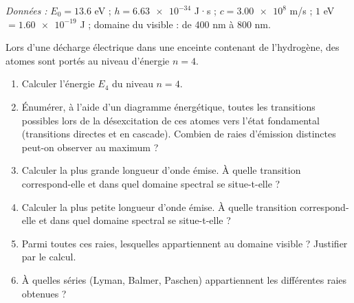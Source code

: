 \documentclass[11pt]{article}
\begin{document}
\begin{exercice}[Type Bac : désexcitation depuis le niveau $n = 4$]
\textit{Données :} $E_0 = \num{13,6}$ eV ; $h = \num{6,63e-34}$ J·s ; $c = \num{3,00e8}$ m/s ; $\num{1}$ eV $= \num{1,60e-19}$ J ; domaine du visible : de \num{400} nm à \num{800} nm.

Lors d'une décharge électrique dans une enceinte contenant de l'hydrogène, des atomes sont portés au niveau d'énergie $n = 4$.
\begin{enumerate}
\item Calculer l'énergie $E_4$ du niveau $n = 4$.
\item Énumérer, à l'aide d'un diagramme énergétique, toutes les transitions possibles lors de la désexcitation de ces atomes vers l'état fondamental (transitions directes et en cascade). Combien de raies d'émission distinctes peut-on observer au maximum ?
\item Calculer la plus grande longueur d'onde émise. À quelle transition correspond-elle et dans quel domaine spectral se situe-t-elle ?
\item Calculer la plus petite longueur d'onde émise. À quelle transition correspond-elle et dans quel domaine spectral se situe-t-elle ?
\item Parmi toutes ces raies, lesquelles appartiennent au domaine visible ? Justifier par le calcul.
\item À quelles séries (Lyman, Balmer, Paschen) appartiennent les différentes raies obtenues ?
\end{enumerate}
\end{exercice}
\end{document}
